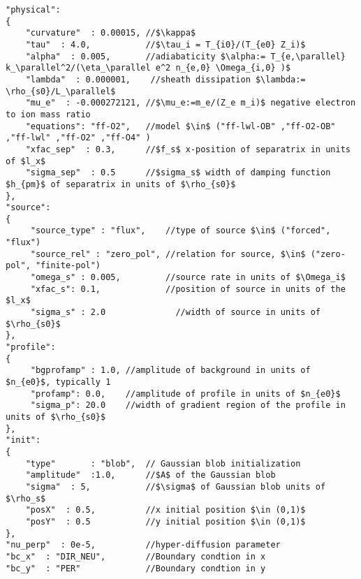 \begin{verbatim}
"physical":
{
    "curvature"  : 0.00015, //$\kappa$
    "tau"  : 4.0,           //$\tau_i = T_{i0}/(T_{e0} Z_i)$
    "alpha"  : 0.005,       //adiabaticity $\alpha:= T_{e,\parallel} k_\parallel^2/(\eta_\parallel e^2 n_{e,0} \Omega_{i,0} )$
    "lambda"  : 0.000001,    //sheath dissipation $\lambda:= \rho_{s0}/L_\parallel$
    "mu_e"  : -0.000272121, //$\mu_e:=m_e/(Z_e m_i)$ negative electron to ion mass ratio
    "equations": "ff-O2",   //model $\in$ ("ff-lwl-OB" ,"ff-O2-OB" ,"ff-lwl" ,"ff-O2" ,"ff-O4" )
    "xfac_sep"  : 0.3,      //$f_s$ x-position of separatrix in units of $l_x$     
    "sigma_sep"  : 0.5      //$sigma_s$ width of damping function $h_{pm}$ of separatrix in units of $\rho_{s0}$    
},
"source":
{
     "source_type" : "flux",    //type of source $\in$ ("forced", "flux")
     "source_rel" : "zero_pol", //relation for source, $\in$ ("zero-pol", "finite-pol")
     "omega_s" : 0.005,         //source rate in units of $\Omega_i$
     "xfac_s": 0.1,             //position of source in units of the $l_x$
     "sigma_s" : 2.0              //width of source in units of $\rho_{s0}$
},
"profile":
{
     "bgprofamp" : 1.0, //amplitude of background in units of $n_{e0}$, typically 1
     "profamp": 0.0,    //amplitude of profile in units of $n_{e0}$
     "sigma_p": 20.0    //width of gradient region of the profile in units of $\rho_{s0}$
},
"init":
{
    "type"       : "blob",  // Gaussian blob initialization
    "amplitude"  :1.0,      //$A$ of the Gaussian blob
    "sigma"  : 5,           //$\sigma$ of Gaussian blob units of $\rho_s$
    "posX"  : 0.5,          //x initial position $\in (0,1)$
    "posY"  : 0.5           //y initial position $\in (0,1)$
},
"nu_perp"  : 0e-5,          //hyper-diffusion parameter
"bc_x"  : "DIR_NEU",        //Boundary condtion in x
"bc_y"  : "PER"             //Boundary condtion in y
\end{verbatim}
